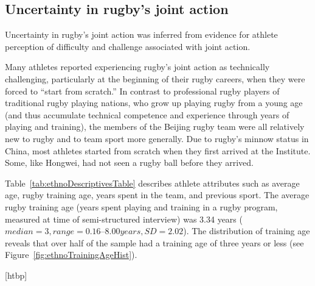 \begin{CJK}{UTF8}{gbsn}
\subsection{Uncertainty in rugby's joint action\label{sect:uncertaintyAthlete}}

Uncertainty in rugby's joint action was inferred from evidence for athlete perception of difficulty and challenge associated with joint action.

Many athletes reported experiencing rugby's joint action as technically challenging, particularly at the beginning of their rugby careers, when they were forced to ``start from scratch.''  In contrast to professional rugby players of traditional rugby playing nations, who grow up playing rugby from a young age (and thus accumulate technical competence and experience through years of playing and training), the members of the Beijing rugby team were all relatively new to rugby and to team sport more generally.   Due to rugby's minnow status in China, most athletes started from scratch when they first arrived at the Institute.  Some, like Hongwei, had not seen a rugby ball before they arrived.

Table~\ref{tab:ethnoDescriptivesTable} describes athlete attributes such as average age, rugby training age, years spent in the team, and previous sport.  The average rugby training age (years spent playing and training in a rugby program, measured at time of semi-structured interview) was 3.34 years ($median = 3, range = 0.16 – 8.00 years, SD = 2.02$). The distribution of training age reveals that over half of the sample had a training age of three years or less (see Figure~\ref{fig:ethnoTrainingAgeHist}).


[htbp]



\end{CJK}
